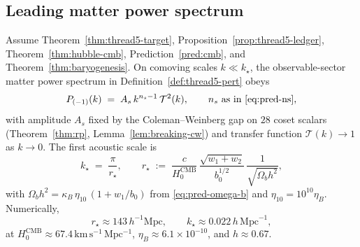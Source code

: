 \subsection{Leading matter power spectrum}
\label{sec:wave2-thread5:power}

\begin{theorem}
\label{thm:thread5-power}
Assume Theorem~\ref{thm:thread5-target}, Proposition~\ref{prop:thread5-ledger},
Theorem~\ref{thm:hubble-cmb}, Prediction~\ref{pred:cmb}, and
Theorem~\ref{thm:baryogenesis}. On comoving scales $k\ll k_\star$, the
observable-sector matter power spectrum in Definition~\ref{def:thread5-pert}
obeys
\begin{equation}\label{eq:thread5-power-law}
  P_{(-1)}(k)
  \;=\;
  A_s\,k^{n_s-1}\,
  \mathcal{T}^2(k),
  \qquad
  n_s \text{ as in \eqref{eq:pred-ns}},
\end{equation}
with amplitude $A_s$ fixed by the Coleman--Weinberg gap on $28$ coset scalars
(Theorem~\ref{thm:rp}, Lemma~\ref{lem:breaking-cw}) and transfer function
$\mathcal{T}(k)\to 1$ as $k\to 0$. The first acoustic scale is
\begin{equation}\label{eq:thread5-kstar}
  k_\star
  \;=\;
  \frac{\pi}{r_\star},
  \qquad
  r_\star
  \;:=\;
  \frac{c}{H_0^{\mathrm{CMB}}}\,
  \frac{\sqrt{w_1+w_2}}{b_0^{1/2}}\,
  \frac{1}{\sqrt{\Omega_b h^2}},
\end{equation}
with $\Omega_b h^2=\kappa_B\,\eta_{10}\,(1+w_1/b_0)$ from \eqref{eq:pred-omega-b}
and $\eta_{10}=10^{10}\eta_B$. Numerically,
\begin{equation}\label{eq:thread5-kstar-numeric}
  r_\star \approx 143\,h^{-1}\mathrm{Mpc},
  \qquad
  k_\star \approx 0.022\,h\,\mathrm{Mpc}^{-1},
\end{equation}
at $H_0^{\mathrm{CMB}}\approx 67.4\,\mathrm{km\,s^{-1}\,Mpc^{-1}}$,
$\eta_B\approx 6.1\times 10^{-10}$, and $h\approx 0.67$.
\end{theorem}

